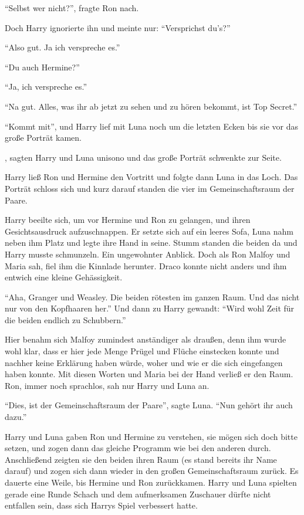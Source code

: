 \enquote{Selbst wer nicht?}, fragte Ron nach.

Doch Harry ignorierte ihn und meinte nur: \enquote{Versprichst du's?}

\enquote{Also gut. \gst Ja ich verspreche es.}

\enquote{Du auch Hermine?}

\enquote{Ja, ich verspreche es.}

\enquote{Na gut. Alles, was ihr ab jetzt zu sehen und zu hören bekommt, ist Top Secret.}

\enquote{Kommt mit}, und Harry lief mit Luna noch um die letzten Ecken bis sie vor das große Porträt kamen.

, sagten Harry und Luna unisono und das große Porträt schwenkte zur Seite.

Harry ließ Ron und Hermine den Vortritt und folgte dann Luna in das Loch. Das Porträt schloss sich und kurz darauf standen die vier im Gemeinschaftsraum der Paare.

Harry beeilte sich, um vor Hermine und Ron zu gelangen, und ihren Gesichtsausdruck aufzuschnappen. Er setzte sich auf ein leeres Sofa, Luna nahm neben ihm Platz und legte ihre Hand in seine. Stumm standen die beiden da und Harry musste schmunzeln. Ein ungewohnter Anblick. Doch als Ron Malfoy und Maria sah, fiel ihm die Kinnlade herunter. Draco konnte nicht anders und ihm entwich eine kleine Gehässigkeit.

\enquote{Aha, Granger und Weasley. Die beiden rötesten im ganzen Raum. Und das nicht nur von den Kopfhaaren her.} Und dann zu Harry gewandt: \enquote{Wird wohl Zeit für die beiden endlich zu Schubbern.}

Hier benahm sich Malfoy zumindest anständiger als draußen, denn ihm wurde wohl klar, dass er hier jede Menge Prügel und Flüche einstecken konnte und nachher keine Erklärung haben würde, woher und wie er die sich eingefangen haben konnte. Mit diesen Worten und Maria bei der Hand verließ er den Raum. Ron, immer noch sprachlos, sah nur Harry und Luna an.

\enquote{Dies, ist der Gemeinschaftsraum der Paare}, sagte Luna. \enquote{Nun gehört ihr auch dazu.}

Harry und Luna gaben Ron und Hermine zu verstehen, sie mögen sich doch bitte setzen, und zogen dann das gleiche Programm wie bei den anderen durch. Anschließend zeigten sie den beiden ihren Raum (es stand bereits ihr Name darauf) und zogen sich dann wieder in den großen Gemeinschaftsraum zurück. Es dauerte eine Weile, bis Hermine und Ron zurückkamen. Harry und Luna spielten gerade eine Runde Schach und dem aufmerksamen Zuschauer dürfte nicht entfallen sein, dass sich Harrys Spiel verbessert hatte.

